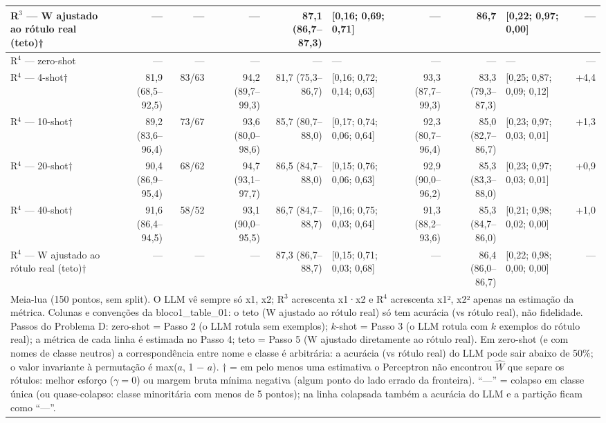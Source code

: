 \begin{table}[htbp]
\begin{tabular}{lrrrrlrrlr}
R$^3$ — W ajustado ao rótulo real (teto)† & — & — & — & 87,1 (86,7–87,3) & [0,16; 0,69; 0,71] & — & 86,7 & [0,22; 0,97; 0,00] & — \\
\midrule
R$^4$ — zero-shot & — & — & — & — & — & — & — & — & — \\
R$^4$ — 4-shot† & 81,9 (68,5–92,5) & 83/63 & 94,2 (89,7–99,3) & 81,7 (75,3–86,7) & [0,16; 0,72; 0,14; 0,63] & 93,3 (87,7–99,3) & 83,3 (79,3–87,3) & [0,25; 0,87; 0,09; 0,12] & +4,4 \\
R$^4$ — 10-shot† & 89,2 (83,6–96,4) & 73/67 & 93,6 (80,0–98,6) & 85,7 (80,7–88,0) & [0,17; 0,74; 0,06; 0,64] & 92,3 (80,7–96,4) & 85,0 (82,7–86,7) & [0,23; 0,97; 0,03; 0,01] & +1,3 \\
R$^4$ — 20-shot† & 90,4 (86,9–95,4) & 68/62 & 94,7 (93,1–97,7) & 86,5 (84,7–88,0) & [0,15; 0,76; 0,06; 0,63] & 92,9 (90,0–96,2) & 85,3 (83,3–88,0) & [0,23; 0,97; 0,03; 0,01] & +0,9 \\
R$^4$ — 40-shot† & 91,6 (86,4–94,5) & 58/52 & 93,1 (90,0–95,5) & 86,7 (84,7–88,7) & [0,16; 0,75; 0,03; 0,64] & 91,3 (88,2–93,6) & 85,3 (84,7–86,0) & [0,21; 0,98; 0,02; 0,00] & +1,0 \\
R$^4$ — W ajustado ao rótulo real (teto)† & — & — & — & 87,3 (86,7–88,7) & [0,15; 0,71; 0,03; 0,68] & — & 86,4 (86,0–86,7) & [0,22; 0,98; 0,00; 0,00] & — \\
\bottomrule
\multicolumn{10}{p{0.95\linewidth}}{\footnotesize Meia-lua (150 pontos, sem split). O LLM vê sempre só x1, x2; R$^3$ acrescenta x1·x2 e R$^4$ acrescenta x1², x2² apenas na estimação da métrica. Colunas e convenções da bloco1\_table\_01: o teto (W ajustado ao rótulo real) só tem acurácia (vs rótulo real), não fidelidade. Passos do Problema D: zero-shot = Passo 2 (o LLM rotula sem exemplos); $k$-shot = Passo 3 (o LLM rotula com $k$ exemplos do rótulo real); a métrica de cada linha é estimada no Passo 4; teto = Passo 5 (W ajustado diretamente ao rótulo real). Em zero-shot (e com nomes de classe neutros) a correspondência entre nome e classe é arbitrária: a acurácia (vs rótulo real) do LLM pode sair abaixo de 50\%; o valor invariante à permutação é max($a$, 1 $-$ $a$). † = em pelo menos uma estimativa o Perceptron não encontrou $\hat{W}$ que separe os rótulos: melhor esforço ($\gamma = 0$) ou margem bruta mínima negativa (algum ponto do lado errado da fronteira). ``—'' = colapso em classe única (ou quase-colapso: classe minoritária com menos de 5 pontos); na linha colapsada também a acurácia do LLM e a partição ficam como ``—''.} \\
\end{tabular}
\end{table}
